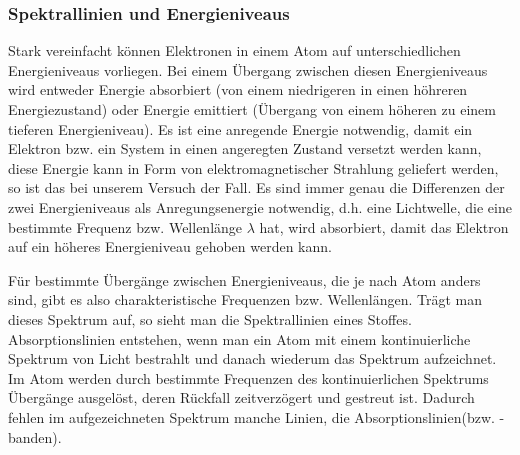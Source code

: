 \subsubsection{Spektrallinien und Energieniveaus}
Stark vereinfacht können Elektronen in einem Atom auf unterschiedlichen Energieniveaus vorliegen. Bei einem Übergang zwischen diesen Energieniveaus wird entweder Energie absorbiert (von einem niedrigeren in einen höhreren Energiezustand) oder Energie emittiert (Übergang von einem höheren zu einem tieferen Energieniveau). Es ist eine anregende Energie notwendig, damit ein Elektron bzw. ein System in einen angeregten Zustand versetzt werden kann, diese Energie kann in Form von elektromagnetischer Strahlung geliefert werden, so ist das bei unserem Versuch der Fall. 
Es sind immer genau die Differenzen der zwei Energieniveaus als Anregungsenergie notwendig, d.h. eine Lichtwelle, die eine bestimmte Frequenz bzw. Wellenlänge \(\lambda\) hat, wird absorbiert, damit das Elektron auf ein höheres Energieniveau gehoben werden kann.

Für bestimmte Übergänge zwischen Energieniveaus, die je nach Atom anders sind, gibt es also charakteristische Frequenzen bzw. Wellenlängen. Trägt man dieses Spektrum auf, so sieht man die Spektrallinien eines Stoffes. Absorptionslinien entstehen, wenn man ein Atom mit einem kontinuierliche Spektrum von Licht bestrahlt und danach wiederum das Spektrum aufzeichnet. Im Atom werden durch bestimmte Frequenzen des kontinuierlichen Spektrums Übergänge ausgelöst, deren Rückfall zeitverzögert und gestreut ist. Dadurch fehlen im aufgezeichneten Spektrum manche Linien, die Absorptionslinien(bzw. -banden).

